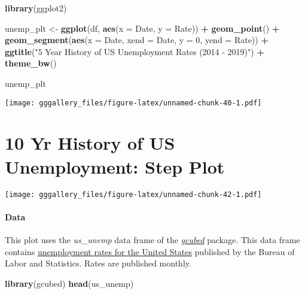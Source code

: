 \documentclass[]{book}
\newenvironment{Shaded}{\begin{snugshade}}{\end{snugshade}}
\newcommand{\DataTypeTok}[1]{\textcolor[rgb]{0.13,0.29,0.53}{#1}}
\newcommand{\DecValTok}[1]{\textcolor[rgb]{0.00,0.00,0.81}{#1}}
\newcommand{\KeywordTok}[1]{\textcolor[rgb]{0.13,0.29,0.53}{\textbf{#1}}}
\newcommand{\NormalTok}[1]{#1}
\newcommand{\OperatorTok}[1]{\textcolor[rgb]{0.81,0.36,0.00}{\textbf{#1}}}
\newcommand{\StringTok}[1]{\textcolor[rgb]{0.31,0.60,0.02}{#1}}
\begin{document}
\begin{Shaded}
\begin{Highlighting}[]
\KeywordTok{library}\NormalTok{(ggplot2)}

\NormalTok{unemp_plt <-}\StringTok{ }\KeywordTok{ggplot}\NormalTok{(df, }\KeywordTok{aes}\NormalTok{(}\DataTypeTok{x =}\NormalTok{ Date, }\DataTypeTok{y =}\NormalTok{ Rate)) }\OperatorTok{+}\StringTok{ }\KeywordTok{geom_point}\NormalTok{() }\OperatorTok{+}\StringTok{ }
\StringTok{  }\KeywordTok{geom_segment}\NormalTok{(}\KeywordTok{aes}\NormalTok{(}\DataTypeTok{x =}\NormalTok{ Date, }\DataTypeTok{xend =}\NormalTok{ Date, }\DataTypeTok{y =} \DecValTok{0}\NormalTok{, }\DataTypeTok{yend =}\NormalTok{ Rate)) }\OperatorTok{+}\StringTok{ }
\StringTok{  }\KeywordTok{ggtitle}\NormalTok{(}\StringTok{"5 Year History of US Unemployment Rates (2014 - 2019)"}\NormalTok{)  }\OperatorTok{+}
\StringTok{  }\KeywordTok{theme_bw}\NormalTok{()}


\NormalTok{unemp_plt}
\end{Highlighting}
\end{Shaded}

\texttt{[image: gggallery\_files/figure-latex/unnamed-chunk-40-1.pdf]}

\hypertarget{unempppp}{%
\chapter*{10 Yr History of US Unemployment: Step Plot}\label{unempppp}}

\texttt{[image: gggallery\_files/figure-latex/unnamed-chunk-42-1.pdf]}

\hypertarget{unemppppdata}{%
\subsubsection*{Data}\label{unemppppdata}}

This plot uses the \emph{us\_unemp} data frame of the \protect\hyperlink{gcubed}{\emph{gcubed}} package. This data frame contains \href{https://data.bls.gov/timeseries/LNS14000000}{unemployment rates for the United States} published by the Bureau of Labor and Statistics. Rates are published monthly.

\begin{Shaded}
\begin{Highlighting}[]
\KeywordTok{library}\NormalTok{(gcubed)}
\KeywordTok{head}\NormalTok{(us_unemp)}
\end{Highlighting}
\end{Shaded}
\end{document}
